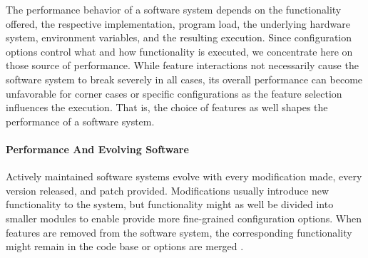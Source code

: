 The performance behavior of a software system depends on the functionality
offered, the respective implementation, program load, the underlying hardware system,
environment variables, and the resulting execution. Since configuration options
control what and how functionality is executed, we concentrate here on those
source of performance. While feature interactions not necessarily cause the
software system to break severely in all cases, its overall performance can
become unfavorable for corner cases or specific configurations as the feature
selection influences the execution. 
That is, the choice of features as well shapes the performance of a software system.

\paragraph{Performance And Evolving Software}
Actively maintained software systems evolve with every modification made, every
version released,  and patch provided. Modifications usually introduce new
functionality to the system, but functionality might as well be divided into
smaller modules to enable provide more fine-grained configuration options. When
features are removed from the software system, the corresponding functionality
might remain in the code base or options are merged
\citep{apel_feature-oriented_2013}.

